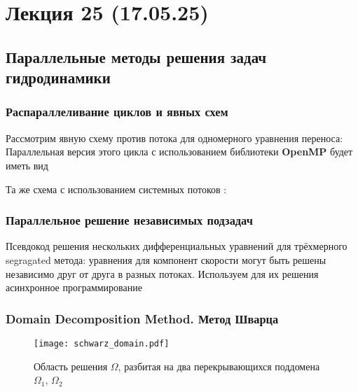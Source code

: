 \section{Лекция 25 (17.05.25)}

\subsection{Параллельные методы решения задач гидродинамики}
\subsubsection{Распараллеливание циклов и явных схем}
Рассмотрим явную схему против потока для одномерного уравнения переноса:
Параллельная версия этого цикла с использованием библиотеки {\bf OpenMP} будет иметь вид

Та же схема с использованием системных потоков :

\subsubsection{Параллельное решение независимых подзадач}
Псевдокод решения  нескольких дифференциальных уравнений
для трёхмерного segragated метода: уравнения для компонент скорости
могут быть решены независимо друг от друга в разных потоках.
Используем для их решения асинхронное программирование


\subsubsection{Domain Decomposition Method. Метод Шварца}

\begin{figure}[h!]
\centering
\texttt{[image: schwarz\_domain.pdf]}
\caption{Область решения $\Omega$, разбитая на два перекрывающихся поддомена $\Omega_1$, $\Omega_2$}
\label{fig:scwarz_domain}
\end{figure}

